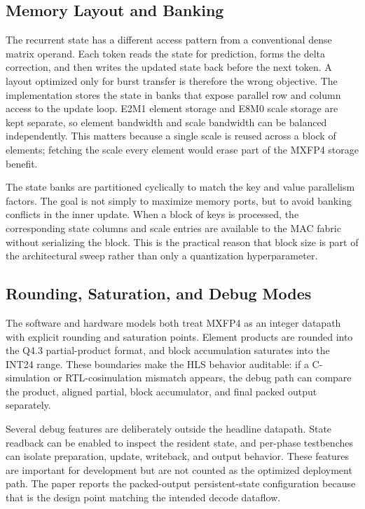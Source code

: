 \documentclass[conference]{IEEEtran}
\begin{document}
\subsection{Memory Layout and Banking}

The recurrent state has a different access pattern from a conventional dense
matrix operand. Each token reads the state for prediction, forms the delta
correction, and then writes the updated state back before the next token. A
layout optimized only for burst transfer is therefore the wrong objective. The
implementation stores the state in banks that expose parallel row and column
access to the update loop. E2M1 element storage and E8M0 scale storage are kept
separate, so element bandwidth and scale bandwidth can be balanced
independently. This matters because a single scale is reused across a block of
elements; fetching the scale every element would erase part of the MXFP4 storage
benefit.

The state banks are partitioned cyclically to match the key and value
parallelism factors. The goal is not simply to maximize memory ports, but to
avoid banking conflicts in the inner update. When a block of keys is processed,
the corresponding state columns and scale entries are available to the MAC
fabric without serializing the block. This is the practical reason that block
size is part of the architectural sweep rather than only a quantization
hyperparameter.

\subsection{Rounding, Saturation, and Debug Modes}

The software and hardware models both treat MXFP4 as an integer datapath with
explicit rounding and saturation points. Element products are rounded into the
Q4.3 partial-product format, and block accumulation saturates into the INT24
range. These boundaries make the HLS behavior auditable: if a C-simulation or
RTL-cosimulation mismatch appears, the debug path can compare the product,
aligned partial, block accumulator, and final packed output separately.

Several debug features are deliberately outside the headline datapath. State
readback can be enabled to inspect the resident state, and per-phase testbenches
can isolate preparation, update, writeback, and output behavior. These features
are important for development but are not counted as the optimized deployment
path. The paper reports the packed-output persistent-state configuration because
that is the design point matching the intended decode dataflow.
\end{document}
